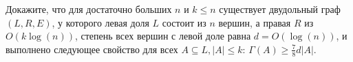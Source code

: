 Докажите, что для достаточно больших $n$ и $k \le n$ существует двудольный граф $(L, R, E)$, у которого
левая доля $L$ состоит из $n$ вершин, а правая $R$ из $O(k\log(n))$, степень всех вершин с левой доле
равна $d = O(\log(n))$, и выполнено следующее свойство для всех $A \subseteq L, |A| \le k$:
$\Gamma(A) \ge \frac{7}{8}d|A|$.
